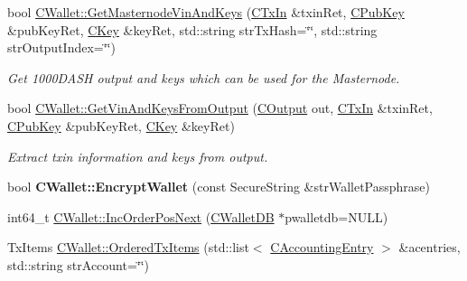\begin{DoxyCompactItemize}
\item 
\mbox{\label{group__map_wallet_ga4deb7baa65e036149f7d19b3aefe7323}} 
bool \mbox{\hyperlink{group__map_wallet_ga4deb7baa65e036149f7d19b3aefe7323}{C\+Wallet\+::\+Get\+Masternode\+Vin\+And\+Keys}} (\mbox{\hyperlink{class_c_tx_in}{C\+Tx\+In}} \&txin\+Ret, \mbox{\hyperlink{class_c_pub_key}{C\+Pub\+Key}} \&pub\+Key\+Ret, \mbox{\hyperlink{class_c_key}{C\+Key}} \&key\+Ret, std\+::string str\+Tx\+Hash=\char`\"{}\char`\"{}, std\+::string str\+Output\+Index=\char`\"{}\char`\"{})
\begin{DoxyCompactList}\small\item\em Get 1000\+D\+A\+SH output and keys which can be used for the Masternode. \end{DoxyCompactList}\item 
\mbox{\label{group__map_wallet_ga7621515b3195b8c8fb130c509725c9f2}} 
bool \mbox{\hyperlink{group__map_wallet_ga7621515b3195b8c8fb130c509725c9f2}{C\+Wallet\+::\+Get\+Vin\+And\+Keys\+From\+Output}} (\mbox{\hyperlink{class_c_output}{C\+Output}} out, \mbox{\hyperlink{class_c_tx_in}{C\+Tx\+In}} \&txin\+Ret, \mbox{\hyperlink{class_c_pub_key}{C\+Pub\+Key}} \&pub\+Key\+Ret, \mbox{\hyperlink{class_c_key}{C\+Key}} \&key\+Ret)
\begin{DoxyCompactList}\small\item\em Extract txin information and keys from output. \end{DoxyCompactList}\item 
\mbox{\label{group__map_wallet_gab34fe5bf771619dcbe22a65f013e5469}} 
bool {\bfseries C\+Wallet\+::\+Encrypt\+Wallet} (const Secure\+String \&str\+Wallet\+Passphrase)
\item 
int64\+\_\+t \mbox{\hyperlink{group__map_wallet_ga7a76d68661e6879651ac0b11f2893e58}{C\+Wallet\+::\+Inc\+Order\+Pos\+Next}} (\mbox{\hyperlink{class_c_wallet_d_b}{C\+Wallet\+DB}} $\ast$pwalletdb=N\+U\+LL)
\item 
Tx\+Items \mbox{\hyperlink{group__map_wallet_ga740572131004d77fbdb4617ec1aafb4a}{C\+Wallet\+::\+Ordered\+Tx\+Items}} (std\+::list$<$ \mbox{\hyperlink{class_c_accounting_entry}{C\+Accounting\+Entry}} $>$ \&acentries, std\+::string str\+Account=\char`\"{}\char`\"{})
\item 
\mbox{\label{group__map_wallet_ga26fd9a9f48230daf346500d2afb6115e}} 

\end{DoxyCompactItemize}
